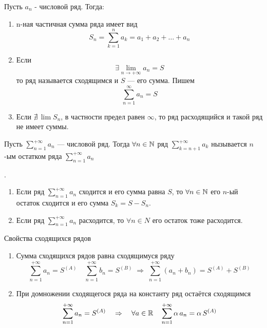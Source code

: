 \begin{Def}
	Пусть $a_n$ - числовой ряд. Тогда:
	\begin{enumerate}
        \item n-ная частичная сумма ряда имеет вид
        \[
            S_n = \sum^n_{k = 1}a_k = a_1 + a_2 + \dots + a_n
        \]
         
        \item Если 
        \[
            \exists \lim_{n \rightarrow +\infty} a_n = S
        \]
        то ряд называется сходящимся и $S$ --- его сумма. Пишем 
        \[
            \sum^{\infty}_{n = 1}a_n = S
        \]
         
        \item Если $\nexists\,\lim S_n$, в частности предел равен $\infty$, то ряд расходящийся и такой ряд не имеет суммы.
    \end{enumerate}
\end{Def}

\begin{Def}
	Пусть $\sum^{+\infty}_{n = 1}a_n$ --- числовой ряд. Тогда $\forall n \in \mathbb{N}$ ряд $\sum^{+\infty}_{k = n + 1}a_k$
    нызывается $n$-ым остатком ряда $\sum^{+\infty}_{n = 1}a_n$
\end{Def}

\pagebreak

\begin{Note}.\\
    \begin{enumerate}
        \item[\textbullet] Если ряд $\sum^{+\infty}_{n = 1}a_n$
        сходится и его сумма равна $S$, то $\forall n \in \mathbb{N}$ его $n$-ый остаток сходится и его сумма $S_k = S - S_n$.
        
        \item[\textbullet] Если ряд $\sum^{+\infty}_{n = 1}a_n$ расходится, то $\forall n \in N$ его остаток тоже расходится.
    \end{enumerate}
    
\end{Note}

\begin{Note}
    Свойства сходящихся рядов
    \begin{enumerate}
        \item Сумма сходящихся рядов равна сходящимуся ряду  
        \[
            \sum^{+\infty}_{n=1}a_n = S^{(A)} \quad \sum^{+\infty}_{n=1}b_n = S^{(B)}\; \Rightarrow\; \sum^{+\infty}_{n=1}(a_n + b_n) = S^{(A)} + S^{(B)}
        \]
         
        \item При домножении сходящегося ряда на константу ряд остаётся сходящимся
        \[
            \sum^{+\infty}_{n=1}a_n = S^{(A)} \quad \Rightarrow \quad \forall a \in \mathbb{R} \quad \sum^{+\infty}_{n=1}\alpha\,a_n = \alpha\,S^{(A)}
        \]
    \end{enumerate}
\end{Note}

